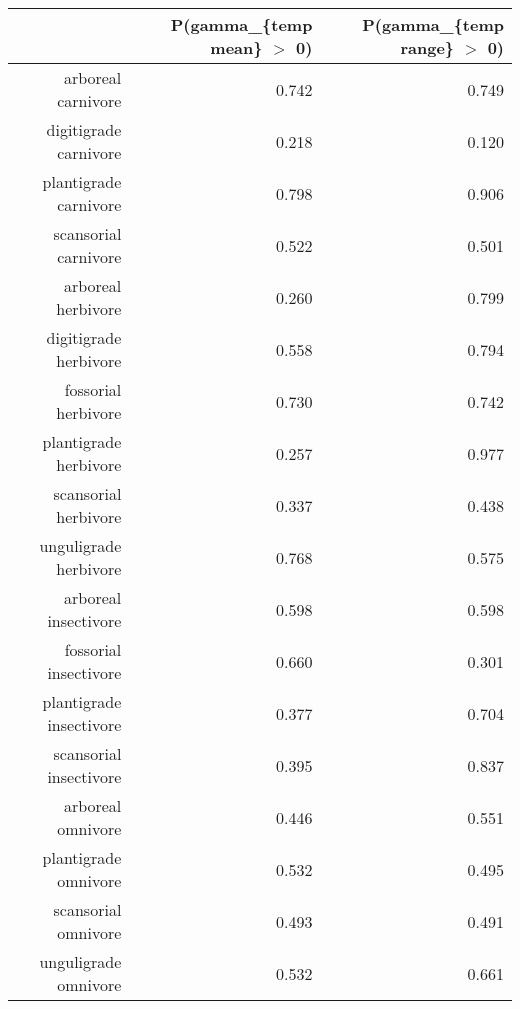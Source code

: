 \begin{table}[ht]
\centering
\begin{tabular}{rrr}
  \hline
 & P(gamma\_\{temp mean\} $>$ 0) & P(gamma\_\{temp range\} $>$ 0) \\ 
  \hline
arboreal carnivore & 0.742 & 0.749 \\ 
  digitigrade carnivore & 0.218 & 0.120 \\ 
  plantigrade carnivore & 0.798 & 0.906 \\ 
  scansorial carnivore & 0.522 & 0.501 \\ 
  arboreal herbivore & 0.260 & 0.799 \\ 
  digitigrade herbivore & 0.558 & 0.794 \\ 
  fossorial herbivore & 0.730 & 0.742 \\ 
  plantigrade herbivore & 0.257 & 0.977 \\ 
  scansorial herbivore & 0.337 & 0.438 \\ 
  unguligrade herbivore & 0.768 & 0.575 \\ 
  arboreal insectivore & 0.598 & 0.598 \\ 
  fossorial insectivore & 0.660 & 0.301 \\ 
  plantigrade insectivore & 0.377 & 0.704 \\ 
  scansorial insectivore & 0.395 & 0.837 \\ 
  arboreal omnivore & 0.446 & 0.551 \\ 
  plantigrade omnivore & 0.532 & 0.495 \\ 
  scansorial omnivore & 0.493 & 0.491 \\ 
  unguligrade omnivore & 0.532 & 0.661 \\ 
   \hline
\end{tabular}
\label{tab:surv_temp}
\end{table}
